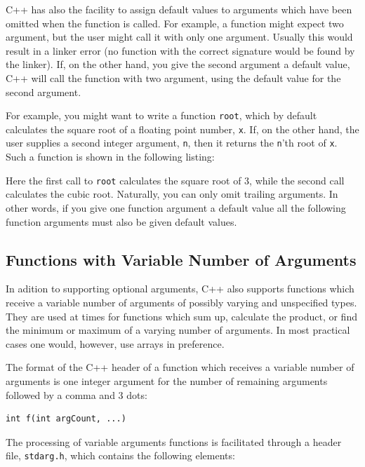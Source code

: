 C++ has also the facility to assign default values to arguments which
have been omitted when the function is called. For example, a function
might expect two argument, but the user might call it with only one
argument. Usually this would result in a linker error (no function
with the correct signature would be found by the linker). If, on the other
hand, you give the second argument a default value, C++ will call the
function with two argument, using the default value for the second
argument.

For example, you might want to write a function \verb+root+, which by default
calculates the square root of a floating point number, \verb+x+. If, on the other
hand, the user supplies a second integer argument, \verb+n+, then it returns the
\verb+n+'th root of \verb+x+. Such a function is shown in the following listing:

\noindent {\small }

\noindent
Here the first call to \verb+root+ calculates the square root
of 3, while the second call calculates the cubic root. Naturally, you can only
omit trailing arguments. In other words, if you give one function argument
a default value all the following function arguments must also be given
default values.


\subsection{Functions with Variable Number of Arguments}

In adition to supporting optional arguments, C++ also supports functions which
receive a variable number of arguments of possibly varying and unspecified
types. They are used at times for functions which sum up, calculate the product,
or find the minimum or maximum of a varying number of arguments. In most practical
cases one would, however, use arrays in preference.

The format of the C++ header of a function which receives a variable number of 
arguments is one integer argument for the number of remaining arguments followed
by a comma and 3 dots:

\noindent
{\small \begin{verbatim}
int f(int argCount, ...)
\end{verbatim}}

The processing of variable arguments functions is facilitated through a header file,
\verb+stdarg.h+, which contains the following elements:

